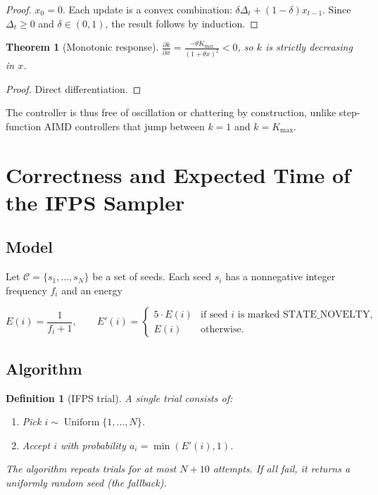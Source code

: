 \documentclass[11pt,a4paper]{article}
\newtheorem{definition}{Definition}
\newtheorem{theorem}{Theorem}
\begin{document}
\begin{proof}
$x_0 = 0$. Each update is a convex combination:
$\delta \Delta_t + (1-\delta) x_{t-1}$. Since $\Delta_t \ge 0$ and
$\delta \in (0,1)$, the result follows by induction.
\end{proof}

\begin{theorem}[Monotonic response]
$\frac{\partial k}{\partial x} = \frac{-\theta K_{\max}}{(1+\theta x)^2} < 0$,
so $k$ is strictly decreasing in $x$.
\end{theorem}

\begin{proof}
Direct differentiation.
\end{proof}

The controller is thus free of oscillation or chattering by construction,
unlike step-function AIMD controllers that jump between $k=1$ and
$k = K_{\max}$.

\section{Correctness and Expected Time of the IFPS Sampler}

\subsection{Model}

Let $\mathcal{C} = \{s_1, \dots, s_N\}$ be a set of seeds.  Each seed
$s_i$ has a nonnegative integer frequency $f_i$ and an energy

\[
E(i) = \frac{1}{f_i + 1},
\qquad
E'(i) =
\begin{cases}
5 \cdot E(i) & \text{if seed $i$ is marked STATE\_NOVELTY}, \\
E(i)         & \text{otherwise}.
\end{cases}
\]

\subsection{Algorithm}

\begin{definition}[IFPS trial]
A single trial consists of:
\begin{enumerate}
  \item Pick $i \sim \operatorname{Uniform}\{1,\dots,N\}$.
  \item Accept $i$ with probability $a_i = \min(E'(i), 1)$.
\end{enumerate}
The algorithm repeats trials for at most $N+10$ attempts. If all
fail, it returns a uniformly random seed (the fallback).
\end{definition}
\end{document}
